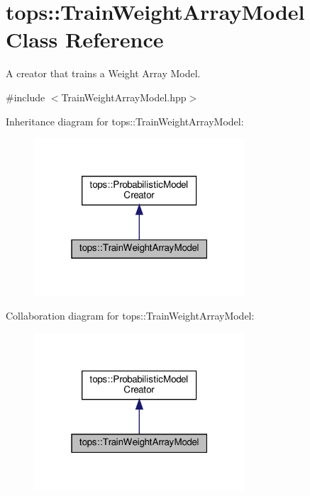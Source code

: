 \hypertarget{classtops_1_1TrainWeightArrayModel}{}\section{tops\+:\+:Train\+Weight\+Array\+Model Class Reference}
\label{classtops_1_1TrainWeightArrayModel}


A creator that trains a Weight Array Model.  




{\ttfamily \#include $<$Train\+Weight\+Array\+Model.\+hpp$>$}



Inheritance diagram for tops\+:\+:Train\+Weight\+Array\+Model\+:
\nopagebreak
\begin{figure}[H]
\begin{center}
\leavevmode
\includegraphics[width=223pt]{classtops_1_1TrainWeightArrayModel__inherit__graph}
\end{center}
\end{figure}


Collaboration diagram for tops\+:\+:Train\+Weight\+Array\+Model\+:
\nopagebreak
\begin{figure}[H]
\begin{center}
\leavevmode
\includegraphics[width=223pt]{classtops_1_1TrainWeightArrayModel__coll__graph}
\end{center}
\end{figure}
